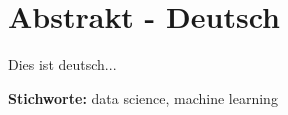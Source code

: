 \section*{Abstrakt - Deutsch}

Dies ist deutsch...

\textbf{Stichworte:} data science, machine learning